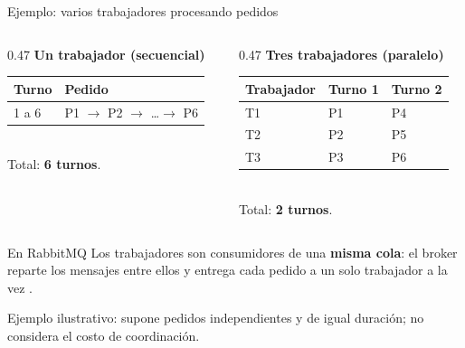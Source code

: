 \begin{frame}{Ejemplo: varios trabajadores procesando pedidos}
  \begin{columns}[T]
    \begin{column}{0.47\textwidth}
      \textbf{Un trabajador (secuencial)}\\[0.15cm]
      \small
      \begin{tabular}{@{}ll@{}}
        \toprule
        Turno & Pedido \\
        \midrule
        1 a 6 & P1 $\rightarrow$ P2 $\rightarrow$ \dots $\rightarrow$ P6 \\
        \bottomrule
      \end{tabular}\\[0.15cm]
      Total: \textbf{6 turnos}.
    \end{column}
    \begin{column}{0.47\textwidth}
      \textbf{Tres trabajadores (paralelo)}\\[0.15cm]
      \small
      \begin{tabular}{@{}lll@{}}
        \toprule
        Trabajador & Turno 1 & Turno 2 \\
        \midrule
        T1 & P1 & P4 \\
        T2 & P2 & P5 \\
        T3 & P3 & P6 \\
        \bottomrule
      \end{tabular}\\[0.15cm]
      Total: \textbf{2 turnos}.
    \end{column}
  \end{columns}

  \vspace{0.3cm}
  \begin{block}{En RabbitMQ}
    Los trabajadores son consumidores de una \textbf{misma cola}: el broker
    reparte los mensajes entre ellos y entrega cada pedido a un solo
    trabajador a la vez \cite{rabbitmq2026amqp}.
  \end{block}

  {\tiny Ejemplo ilustrativo: supone pedidos independientes y de igual
  duración; no considera el costo de coordinación.}
\end{frame}

